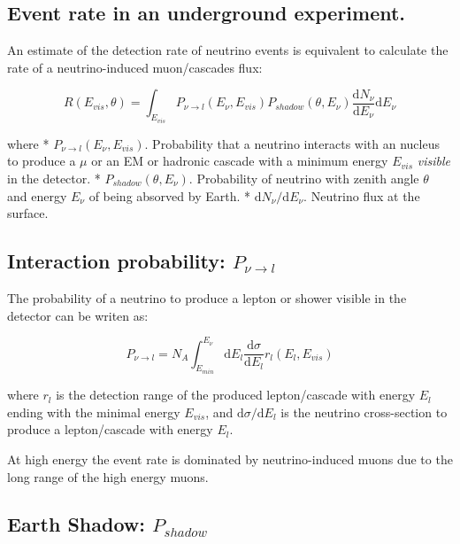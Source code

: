 \documentclass[
  letterpaper,
  DIV=11,
  numbers=noendperiod]{scrreprt}
\begin{document}
\subsection*{Event rate in an underground
experiment.}\label{event-rate-in-an-underground-experiment.}

An estimate of the detection rate of neutrino events is equivalent to
calculate the rate of a neutrino-induced muon/cascades flux:

\[R(E_{vis}, \theta) = \int_{E_{vis}} P_{\nu\rightarrow l} (E_\nu, E_{vis}) P_{shadow}(\theta, E_\nu) \frac{\mathrm{ d}N_\nu}{\mathrm{ d}E_\nu}\mathrm{ d}E_\nu\]

where * \(P_{\nu\rightarrow l}(E_\nu, E_{vis})\). Probability that a
neutrino interacts with an nucleus to produce a \(\mu\) or an EM or
hadronic cascade with a minimum energy \(E_{vis}\) \emph{visible} in the
detector. * \(P_{shadow} (\theta, E_\nu)\). Probability of neutrino with
zenith angle \(\theta\) and energy \(E_\nu\) of being absorved by Earth.
* \({\mathrm{ d}N_\nu}/{\mathrm{ d}E_\nu}\). Neutrino flux at the
surface.

\subsection*{\texorpdfstring{Interaction probability:
\(P_{\nu\rightarrow l}\)}{Interaction probability: P\_\{\textbackslash nu\textbackslash rightarrow l\}}}\label{interaction-probability-p_nurightarrow-l}

The probability of a neutrino to produce a lepton or shower visible in
the detector can be writen as:

\[P_{\nu \rightarrow l} = N_A \int_{E_{min}}^{E_\nu} \mathrm{ d}E_l \frac{\mathrm{ d}\sigma}{\mathrm{ d}E_l}r_l(E_l, E_{vis})\]

where \(r_l\) is the detection range of the produced lepton/cascade with
energy \(E_l\) ending with the minimal energy \(E_{vis}\), and
\({\mathrm{ d}\sigma}/{\mathrm{ d}E_l}\) is the neutrino cross-section
to produce a lepton/cascade with energy \(E_l\).

At high energy the event rate is dominated by neutrino-induced muons due
to the long range of the high energy muons.

\subsection*{\texorpdfstring{Earth Shadow:
\(P_{shadow}\)}{Earth Shadow: P\_\{shadow\}}}\label{earth-shadow-p_shadow}
\end{document}

